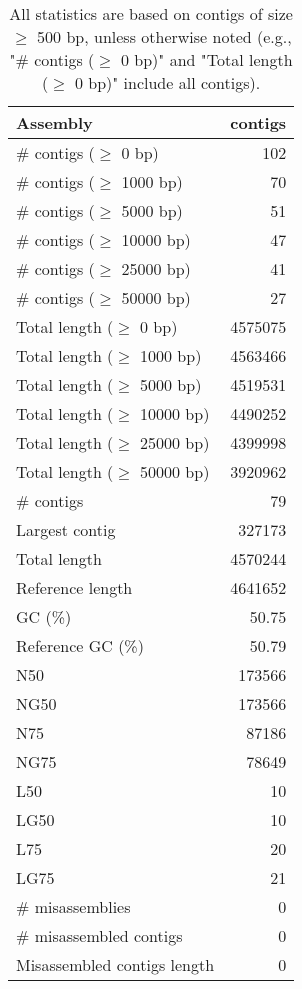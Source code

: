 \documentclass[12pt,a4paper]{article}
\begin{document}
\begin{table}[ht]
\begin{center}
\caption{All statistics are based on contigs of size $\geq$ 500 bp, unless otherwise noted (e.g., "\# contigs ($\geq$ 0 bp)" and "Total length ($\geq$ 0 bp)" include all contigs).}
\begin{tabular}{|l*{1}{|r}|}
\hline
Assembly & contigs \\ \hline
\# contigs ($\geq$ 0 bp) & 102 \\ \hline
\# contigs ($\geq$ 1000 bp) & 70 \\ \hline
\# contigs ($\geq$ 5000 bp) & 51 \\ \hline
\# contigs ($\geq$ 10000 bp) & 47 \\ \hline
\# contigs ($\geq$ 25000 bp) & 41 \\ \hline
\# contigs ($\geq$ 50000 bp) & 27 \\ \hline
Total length ($\geq$ 0 bp) & 4575075 \\ \hline
Total length ($\geq$ 1000 bp) & 4563466 \\ \hline
Total length ($\geq$ 5000 bp) & 4519531 \\ \hline
Total length ($\geq$ 10000 bp) & 4490252 \\ \hline
Total length ($\geq$ 25000 bp) & 4399998 \\ \hline
Total length ($\geq$ 50000 bp) & 3920962 \\ \hline
\# contigs & 79 \\ \hline
Largest contig & 327173 \\ \hline
Total length & 4570244 \\ \hline
Reference length & 4641652 \\ \hline
GC (\%) & 50.75 \\ \hline
Reference GC (\%) & 50.79 \\ \hline
N50 & 173566 \\ \hline
NG50 & 173566 \\ \hline
N75 & 87186 \\ \hline
NG75 & 78649 \\ \hline
L50 & 10 \\ \hline
LG50 & 10 \\ \hline
L75 & 20 \\ \hline
LG75 & 21 \\ \hline
\# misassemblies & 0 \\ \hline
\# misassembled contigs & 0 \\ \hline
Misassembled contigs length & 0 \\ \hline

\end{tabular}
\end{center}
\end{table}
\end{document}
